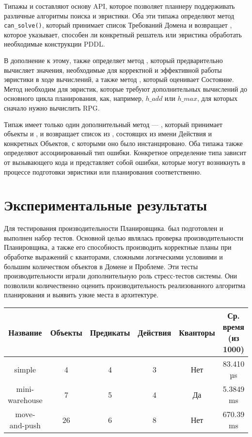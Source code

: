 Типажы  и  составляют основу API,
которое позволяет планнеру поддерживать различные алгоритмы поиска и эвристики.
Оба эти типажа определяют метод \texttt{can\_solve()},
который принимает список Требований Домена и возвращает ,
которое указывает, способен ли конкретный решатель или эвристика
обработать необходимые конструкции PDDL.

В дополнение к этому,  также определяет метод ,
который предварительно вычисляет значения,
необходимые для корректной и эффективной работы эвристики в ходе вычислений,
а также метод , который оценивает Состояние.
Метод  необходим для эвристик,
которые требуют дополнительных вычислений до основного цикла планирования,
как, например, $h\_{add}$ или $h\_{max}$, 
для которых сначало нужно вычислить RPG.

Типаж  имеет только один дополнительный метод --- ,
который принимает объекты  и ,
и возвращает список из ,
состоящих из имени Действия и конкретных Объектов, с которыми оно было инстанцировано.
Оба типажа также определяют ассоциированный тип ошибки.
Конкретное определение типа зависит от вызывающего кода и представляет собой ошибки,
которые могут возникнуть в процессе подготовки эвристики или планирования соответственно.

\section{Экспериментальные результаты}

Для тестирования производительности Планировщика.
был подготовлен и выполнен набор тестов.
Основной целью являлась проверка производительности
Планировщика, а также его способность производить
корректные планы при обработке выражений с кванторами,
сложными логическими условиями и большим количеством объектов в Домене и Проблеме.
Эти тесты производительности играли дополнительную роль стресс-тестов системы.
Они позволили количественно оценить производительность
реализованного алгоритма планирования и выявить узкие места в архитектуре.

\begin{table}
  \centering
  \begin{footnotesize}
  \caption{Результаты тестов}
  \label{tab:benchresults}
    \begin{longtable}{|c|c|c|c|c|c|}
    \hline
      Название & Объекты & Предикаты & Действия & Кванторы & Ср. время (из 1000)\\
    \hline
    \hline
    simple & 4 & 4 & 3 & Нет & 83.410 µs\\
    \hline
    mini-warehouse & 7 & 5 & 4 & Да & 5.3849 ms\\
    \hline
    move-and-push & 26 & 6 & 8 & Нет & 670.39 ms\\
    \hline
  \end{longtable}
  \end{footnotesize}
\end{table}

